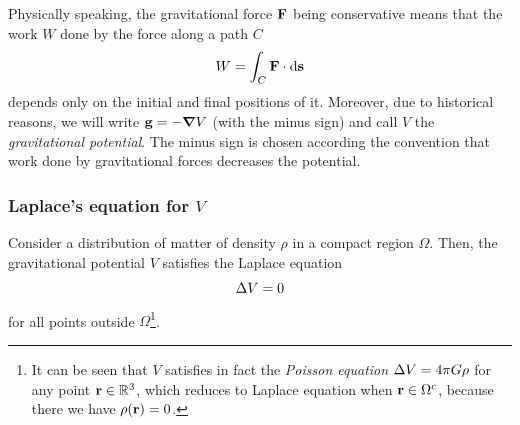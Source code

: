 \documentclass[../main.tex]{subfiles}
\begin{document}
Physically speaking, the gravitational force $\boldsymbol{\mathrm{F}}$ being conservative means that the work $W$ done by the force along a path $C$
\begin{equation}
  W=\int_C\boldsymbol{\mathrm{F}}\cdot\dd{\boldsymbol{\mathrm{s}}}
\end{equation}
depends only on the initial and final positions of it. Moreover, due to historical reasons, we will write $\boldsymbol{\mathrm{g}}=-\grad V$ (with the minus sign) and call $V$ the \emph{gravitational potential}. The minus sign is chosen according the convention that work done by gravitational forces decreases the potential.
\subsubsection{Laplace's equation for \texorpdfstring{$V$}{V}}
\begin{theorem}
  Consider a distribution of matter of density $\rho$ in a compact region $\Omega$. Then, the gravitational potential $V$ satisfies the Laplace equation
  \begin{equation}
    \Delta V = 0
  \end{equation}
  for all points outside $\Omega$\footnote{It can be seen that $V$ satisfies in fact the \emph{Poisson equation} $\Delta V=4\pi G\rho$ for any point $\boldsymbol{\mathrm{r}}\in\mathbb{R}^3$, which reduces to Laplace equation when $\boldsymbol{\mathrm{r}}\in\Omega^c$, because there we have $\rho(\boldsymbol{\mathrm{r}})=0$.}.
\end{theorem}
\end{document}
